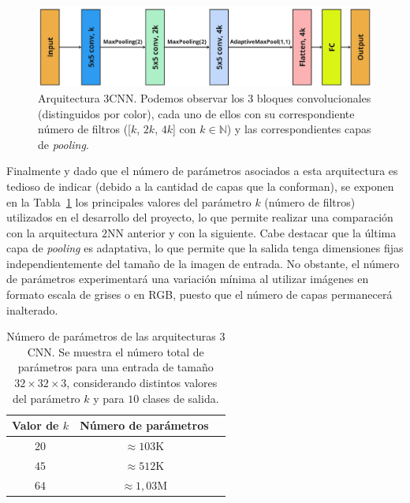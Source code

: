 \begin{figure}[h]
    \centering
    \includegraphics[width=0.8\linewidth]{img/experiments/3CNN.png}
    \caption[Arquitectura $3$CNN.]{Arquitectura $3$CNN. Podemos observar los $3$ bloques convolucionales (distinguidos por color), cada uno de ellos con su correspondiente número de filtros ([$k$, $2k$, $4k$] con $k \in \mathbb{N}$) y las correspondientes capas de \textit{pooling}.}\label{fig:3CNN}
\end{figure}

Finalmente y dado que el número de parámetros asociados a esta arquitectura es tedioso de indicar (debido a la cantidad de capas que la conforman), se exponen en la Tabla~\ref{tab:numero-parametros3cnn} los principales valores del parámetro $k$ (número de filtros) utilizados en el desarrollo del proyecto, lo que permite realizar una comparación con la arquitectura $2$NN anterior y con la siguiente. Cabe destacar que la última capa de \textit{pooling} es adaptativa, lo que permite que la salida tenga dimensiones fijas independientemente del tamaño de la imagen de entrada. No obstante, el número de parámetros experimentará una variación mínima al utilizar imágenes en formato escala de grises o en RGB, puesto que el número de capas permanecerá inalterado.

\begin{table}[ht]
    \centering
    \begin{tabular}{|c|c|c|}
    \hline
    \textbf{Valor de $k$}           & \textbf{Número de parámetros}                     
    \\ \hline
    $20$                  & $\approx 103$\space K                                            \\ \hline
    $45$                  & $\approx 512$\space K                                             \\ \hline
    $64$                  & $\approx 1,03$\space M                                             \\ \hline
    \end{tabular}
    \caption[Número de parámetros de las arquitecturas $3$CNN.]{Número de parámetros de las arquitecturas $3$CNN. Se muestra el número total de parámetros para una entrada de tamaño $32 \times 32 \times 3$, considerando distintos valores del parámetro $k$ y para $10$ clases de salida.}\label{tab:numero-parametros3cnn}
\end{table}


